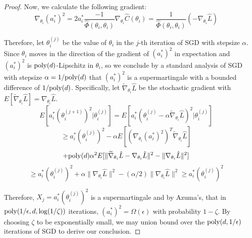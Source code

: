 \documentclass{article}
\begin{document}
\begin{proof}
Now, we calculate the following gradient: 
%
\begin{equation}
\nabla_{\theta_i} (a_i^*)^2 = 2a_i^*\frac{-1}{\widehat{\Phi}(\theta_i,\theta_i)} \nabla_{\theta_i} \widehat{C}(\theta_i) = \frac{1}{\widehat{\Phi}(\theta_i,\theta_i)} (-\nabla_{\theta_i} \widehat{L})
\end{equation}

Therefore, let $\theta_{i}^{(j)}$ be the value of $\theta_i$ in the $j$-th iteration of SGD with stepsize $\alpha$. Since $\theta_i$ moves in the direction of the gradient of $(a_i^*)^2$ in expectation and $(a_i^*)^2$ is $\mathrm{poly}(d)$-Lipschitz in $\theta_i$, so we conclude by a standard analysis of SGD with stepsize $\alpha = 1/\mathrm{poly}(d)$ that $(a_i^*)^2$ is a supermartingale with a bounded difference of $1/\mathrm{poly}(d)$. Specifically, let $\widetilde{\nabla}_{\theta_i}\hat{L}$ be the stochastic gradient with $E[\widetilde{\nabla}_{\theta_i}\hat{L}] = \nabla_{\theta_i}\hat{L}$.
%
\[E[a_i^*(\theta_i^{(j+1)})^2 | \theta_{i}^{(j)}] = E[a_i^*(\theta_i^{(j)} - \alpha \widetilde{\nabla}_{\theta_i} \hat{L})^2 |\theta_{i}^{(j)}] \]
\[\geq a_i^*(\theta_i^{(j)})^2 - \alpha E[(\nabla_{\theta_i}(a_i^*)^2)^T\widetilde{\nabla}_{\theta_i}\hat{L}]\]
%
\[+ \mathrm{poly}(d)\alpha^2E[\|\widetilde{\nabla}_{\theta_i}\hat{L} - \nabla_{\theta_i}\hat{L}\|^2 - \|\nabla_{\theta_i}\hat{L}\|^2]\]
%
\[\geq a_i^*(\theta_i^{(j)})^2 + \alpha \|\nabla_{\theta_i}\hat{L}\|^2 - (\alpha/2) \|\nabla_{\theta_i}\hat{L}\|^2 \geq a_i^*(\theta_i^{(j)})^2  \]

Therefore, $X_j = a_i^*(\theta_i^{(j)})^2$ is a supermartingale and by Azuma's, that in $\mathrm{poly}(1/\epsilon,d,\log(1/\zeta))$ iterations, $(a_i^*)^2 = \Omega(\epsilon)$ with probability $1-\zeta$. By choosing $\zeta$ to be exponentially small, we may union bound over the $\mathrm{poly}(d,1/\epsilon)$ iterations of SGD to derive our conclusion.
\end{proof}

%


\polyConv*
\end{document}
